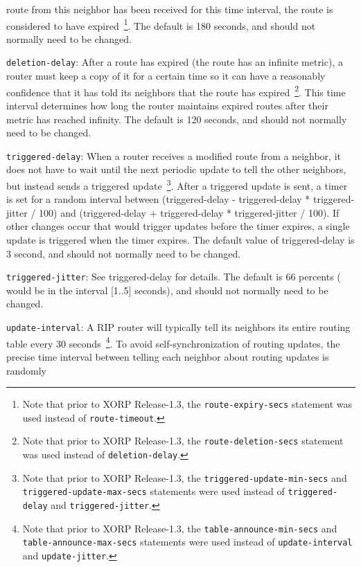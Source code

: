 \begin{description}
\begin{description}
  route from this neighbor has been received for this time interval,
  the route is considered to have expired~\footnote{Note that prior
  to XORP Release-1.3, the {\tt route-expiry-secs} statement was used
  instead of {\tt route-timeout}.}.  The default is 180 seconds,
  and should not normally need to be changed.
\item{\tt deletion-delay}: After a route has expired (the
  route has an infinite metric), a router must keep a copy of it for a
  certain time so it can have a reasonably confidence that it has told
  its neighbors that the route has expired~\footnote{Note that prior
  to XORP Release-1.3, the {\tt route-deletion-secs} statement was used
  instead of {\tt deletion-delay}.}.  This time interval
  determines how long the router maintains expired routes after their
  metric has reached infinity. The default is 120 seconds, and should
  not normally need to be changed.  
\item{\tt triggered-delay}: When a router receives a
  modified route from a neighbor, it does not have to wait until the
  next periodic update to tell the other neighbors, but instead sends
  a triggered update~\footnote{Note that prior
  to XORP Release-1.3, the {\tt triggered-update-min-secs} and
  {\tt triggered-update-max-secs} statements were used
  instead of {\tt triggered-delay} and {\tt triggered-jitter}.}.
  After a triggered update is sent, a timer is
  set for a random interval between
  {\stt (triggered-delay - triggered-delay * triggered-jitter / 100)} and
  {\stt (triggered-delay + triggered-delay * triggered-jitter / 100)}.
  If other changes occur that
  would trigger updates before the timer expires, a single update is
  triggered when the timer expires.  The default value of {\stt
  triggered-delay} is 3 second, and should not normally need
  to be changed.
\item{\tt triggered-jitter}: See {\stt
  triggered-delay} for details.  The default is 66 percents
  ( would be in the interval [1..5] seconds),
  and should not normally need to be changed.
\item{\tt update-interval}: A RIP router will typically tell
  its neighbors its entire routing table every 30 seconds~\footnote{Note that
  prior to XORP Release-1.3, the {\tt table-announce-min-secs} and
  {\tt table-announce-max-secs} statements were used
  instead of {\tt update-interval} and {\tt update-jitter}.}.  To avoid
  self-synchronization of routing updates, the precise time interval
  between telling each neighbor about routing updates is randomly

\end{description}
\end{description}
